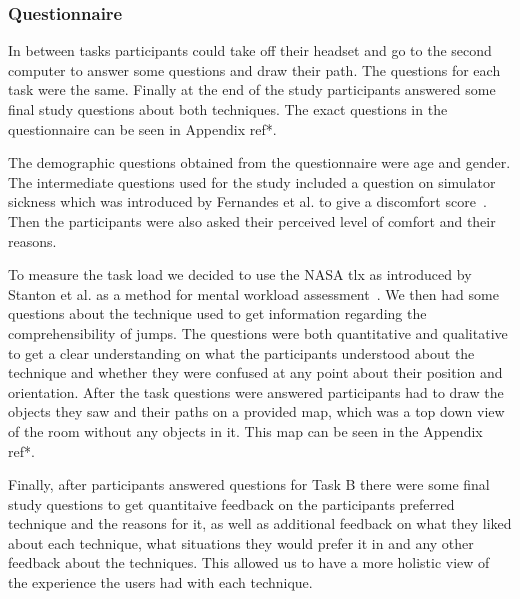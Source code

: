 \subsubsection{Questionnaire}
\label{subsubsection DPUS SP SP: User Feedback}
In between tasks participants could take off their headset and go to the second computer to answer some questions and draw their path. The questions for each task were the same. Finally at the end of the study participants answered some final study questions about both techniques. The exact questions in the questionnaire can be seen in Appendix ref*.

The demographic questions obtained from the questionnaire were age and gender. The intermediate questions used for the study included a question on simulator sickness which was introduced by Fernandes et al. to give a discomfort score~\cite{Fernandes2016}. Then the participants were also asked their perceived level of comfort and their reasons.

To measure the task load we decided to use the NASA \acrfull{tlx} as introduced by Stanton et al. as a method for mental workload assessment~\cite{Stanton2005}. We then had some questions about the technique used to get information regarding the comprehensibility of jumps. The questions were both quantitative and qualitative to get a clear understanding on what the participants understood about the technique and whether they were confused at any point about their position and orientation. After the task questions were answered participants had to draw the objects they saw and their paths on a provided map, which was a top down view of the room without any objects in it. This map can be seen in the Appendix ref*.

Finally, after participants answered questions for Task B there were some final study questions to get quantitaive feedback on the participants preferred technique and the reasons for it, as well as additional feedback on what they liked about each technique, what situations they would prefer it in and any other feedback about the techniques. This allowed us to have a more holistic view of the experience the users had with each technique.



